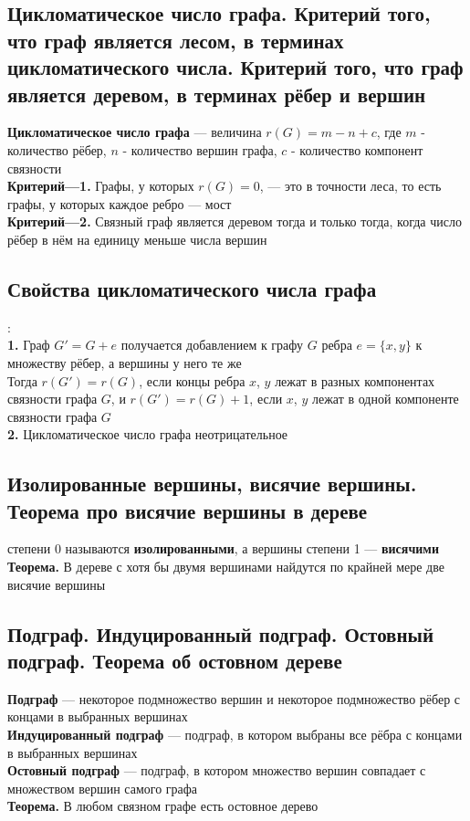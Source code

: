 \documentclass[a4paper]{article}
\begin{document}
\subsection{Цикломатическое число графа. Критерий того, что граф является лесом, в терминах цикломатического числа. Критерий того, что граф является деревом, в терминах рёбер и вершин}
\textbf{Цикломатическое число графа} — величина $r(G)=m-n+c$, где $m$ - количество рёбер, $n$ - количество вершин графа, $c$ - количество компонент связности\\[2mm]
\indent\textbf{Критерий—1.} Графы, у которых $r(G)=0$, — это в точности леса, то есть графы, у которых каждое ребро — мост\\[2mm]
\indent\textbf{Критерий—2.} Связный граф является деревом тогда и только тогда, когда число рёбер в нём на единицу меньше числа вершин
\label{1.4}

\subsection{Свойства цикломатического числа графа}
:\\[2mm]
\indent\textbf{1.} Граф $G'=G+e$ получается добавлением к графу $G$ ребра $e=\{x,y\}$ к множеству рёбер, а вершины у него те же\\
\indent Тогда $r(G')=r(G)$, если концы ребра $x$, $y$ лежат в разных компонентах связности графа $G$, и $r(G')=r(G)+1$, если $x$, $y$ лежат в одной компоненте связности графа $G$\\[2mm]
\indent\textbf{2.} Цикломатическое число графа неотрицательное

\subsection{Изолированные вершины, висячие вершины. Теорема про висячие вершины в дереве}
 степени 0 называются \textbf{изолированными}, а вершины степени 1 — \textbf{висячими}\\[2mm]
\textbf{Теорема.} В дереве с хотя бы двумя вершинами найдутся по крайней мере две висячие вершины

\subsection{Подграф. Индуцированный подграф. Остовный подграф. Теорема об остовном дереве}
\textbf{Подграф} — некоторое подмножество вершин и некоторое подмножество рёбер с концами в выбранных вершинах\\[2mm]
\indent\textbf{Индуцированный подграф} — подграф, в котором выбраны все рёбра с концами в выбранных вершинах\\[2mm]
\indent\textbf{Остовный подграф} — подграф, в котором множество вершин совпадает с множеством вершин самого графа\\[2mm]
\indent\textbf{Теорема.} В любом связном графе есть остовное дерево
\end{document}
